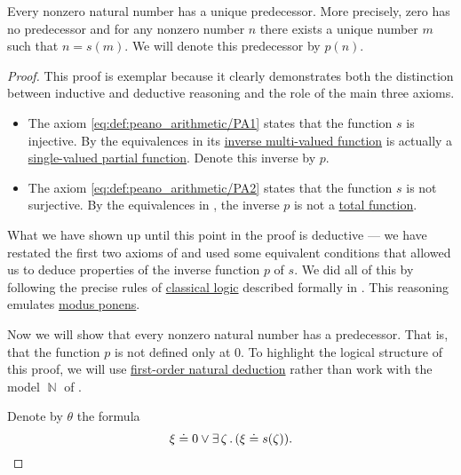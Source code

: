 \begin{proposition}\label{thm:nonzero_natural_numbers_have_predecessors}
  Every nonzero natural number has a unique predecessor. More precisely, zero has no predecessor and for any nonzero number \( n \) there exists a unique number \( m \) such that \( n = s(m) \). We will denote this predecessor by \( p(n) \).
\end{proposition}
\begin{proof}
  This proof is exemplar because it clearly demonstrates both the distinction between inductive and deductive reasoning and the role of the main three axioms.

  \begin{itemize}
    \item The axiom \eqref{eq:def:peano_arithmetic/PA1} states that the function \( s \) is injective. By the equivalences in  its \hyperref[def:multi_valued_function/inverse]{inverse multi-valued function} is actually a \hyperref[def:partial_function]{single-valued partial function}. Denote this inverse by \( p \).

    \item The axiom \eqref{eq:def:peano_arithmetic/PA2} states that the function \( s \) is not surjective. By the equivalences in , the inverse \( p \) is not a \hyperref[def:multi_valued_function/total]{total function}.
  \end{itemize}

  What we have shown up until this point in the proof is deductive --- we have restated the first two axioms of  and used some equivalent conditions that allowed us to deduce properties of the inverse function \( p \) of \( s \). We did all of this by following the precise rules of \hyperref[def:classical_logic]{classical logic} described formally in . This reasoning emulates \hyperref[eq:def:positive_implicational_propositional_derivation_system/rules/modus_ponens]{modus ponens}.

  Now we will show that every nonzero natural number has a predecessor. That is, that the function \( p \) is not defined only at \( 0 \). To highlight the logical structure of this proof, we will use \hyperref[def:first_order_derivation_system]{first-order natural deduction} rather than work with the model \( \BbbN \) of .

  Denote by \( \theta \) the formula
  \begin{equation*}
    \xi \doteq 0 \vee \exists \thinspace \zeta \thinspace . \thinspace (\xi \doteq s(\zeta)).
  \end{equation*}


\end{proof}

